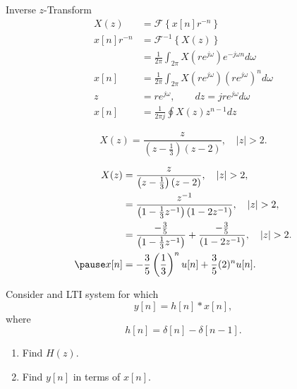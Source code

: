 \begin{frame}{Inverse $z$-Transform}
    \begin{align*}
        X(z) &= \mathcal{F}\left\{x[n]r^{-n}\right\}\\
        x[n]r^{-n} &= \mathcal{F}^{-1}\left\{X(z)\right\}\\
        &= \frac{1}{2\pi}\int_{2\pi}X(re^{j\omega}) e^{-j\omega n}d\omega\\
        x[n] &= \frac{1}{2\pi}\int_{2\pi}X(re^{j\omega})\left(re^{j\omega}\right)^nd\omega\\
        z &= re^{j\omega}, \qquad dz = jre^{j\omega}d\omega\\
        x[n] &= \frac{1}{2\pi j} \oint X(z)z^{n-1}dz
    \end{align*}
\end{frame}


\begin{frame}
    \begin{example}
        \begin{equation*}
            X(z) = \frac{z}{\left(z-\frac{1}{3}\right)(z-2)}, \quad |z|>2.
        \end{equation*}
    \end{example}
    \pause
    {
        \begin{solution}
            \begin{align*}
                X(z) &= \frac{z}{\left(z-\frac{1}{3}\right)(z-2)}, \quad |z|>2,\\
                &= \frac{z^{-1}}{\left(1-\frac{1}{3}z^{-1}\right)(1-2z^{-1})}, \quad |z|>2,\\
                &= \frac{-\frac{3}{5}}{\left(1-\frac{1}{3}z^{-1}\right)} + \frac{-\frac{3}{5}}{(1-2z^{-1})}, \quad |z|>2.\\
                \pause
                x[n] &=  -\frac{3}{5} \left(\frac{1}{3}\right)^nu[n] + \frac{3}{5} (2)^n u[n].\\
            \end{align*}
        \end{solution}
    }
\end{frame} 


\begin{frame}
    \begin{example}
        Consider and LTI system for which
        \begin{equation*}
            y[n] = h[n]\ast x[n],
        \end{equation*}
        where
        \begin{equation*}
            h[n] = \delta[n] - \delta[n-1].
        \end{equation*}
        \begin{enumerate}
            \item Find $H(z)$.
            \item Find $y[n]$ in terms of $x[n]$.
        \end{enumerate}
    \end{example}
\end{frame}

